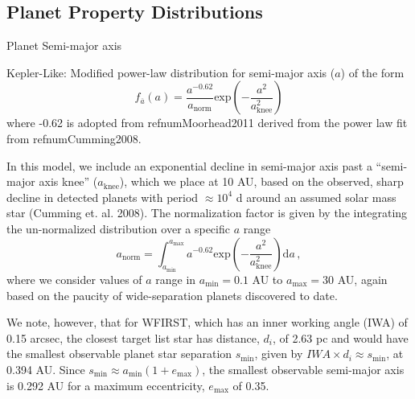 \documentclass[aspectratio=169]{beamer}
\begin{document}
\subsection{Planet Property Distributions}
\begin{frame}{Planet Semi-major axis }

Kepler-Like: Modified power-law distribution for semi-major axis ($a$) of the form
\begin{equation}
    f_{\overline{a}} (a) = \frac{a^{-0.62}}{a_\mathrm{norm}} \mathrm{exp} \left( -\frac{a^2}{a_\mathrm{knee}^2} \right)
\end{equation} %
where -0.62 is adopted from refnum{Moorhead2011} derived from the power law fit from refnum{Cumming2008}. %

In this model, we include an exponential decline in semi-major axis past a ``semi-major axis knee'' ($a_{\mathrm{knee}}$), which we place at 10 AU, based on the observed, sharp decline in detected planets with period $\approx 10^4$ d around an assumed solar mass star (Cumming et. al. 2008). %
The normalization factor is given by the integrating the un-normalized distribution over a specific $a$ range
\begin{equation}
    a_{\mathrm{norm}} = \int_{a_\mathrm{min}}^{a_\mathrm{max}} a^{-0.62} \mathrm{exp} \left( -\frac{a^2}{a_\mathrm{knee}^2} \right) \mathrm{d}a \,,
\end{equation} %
where we consider values of $a$ range in $a_{\mathrm{min}} = 0.1$ AU to $a_{\mathrm{max}} = 30$ AU, again based on the paucity of wide-separation planets discovered to date. 

We note, however, that for WFIRST, which has an inner working angle (IWA) of 0.15 arcsec, the closest target list star has distance, $d_i$, of 2.63 pc and would have the smallest observable planet star separation $s_{\mathrm{min}}$, given by $IWA \times d_i \approx s_{\mathrm{min}}$, at 0.394 AU. 
Since $s_{\mathrm{min}}\approx a_{\mathrm{min}}(1+e_{\mathrm{max}})$, the smallest observable semi-major axis is 0.292 AU for a maximum eccentricity, $e_{\mathrm{max}}$ of 0.35. %
\end{frame}
\end{document}
